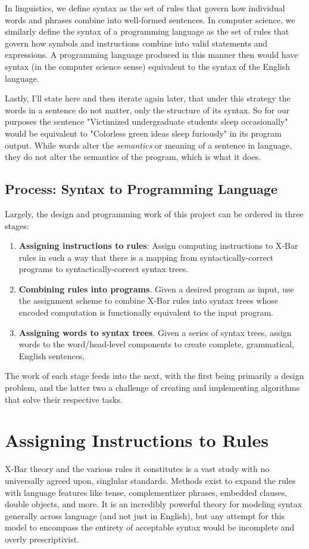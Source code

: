 \documentclass[runningheads]{llncs}
\begin{document}
In linguistics, we define syntax as the set of rules that govern how individual words and phrases combine into well-formed sentences. In computer science, we similarly define the syntax of a programming language as the set of rules that govern how symbols and instructions combine into valid statements and expressions. A programming language produced in this manner then would have syntax (in the computer science sense) equivalent to the syntax of the English language.

Lastly, I'll state here and then iterate again later, that under this strategy the words in a sentence do not matter, only the structure of its syntax. So for our purposes the sentence "Victimized undergraduate students sleep occasionally" would be equivalent to "Colorless green ideas sleep furiously" in its program output. While words alter the \textit{semantics} or meaning of a sentence in language, they do not alter the semantics of the program, which is what it does.

\subsection{Process: Syntax to Programming Language}
Largely, the design and programming work of this project can be ordered in three stages:
\begin{enumerate}
	\item \textbf{Assigning instructions to rules}: Assign computing instructions to X-Bar rules in such a way that there is a mapping from syntactically-correct programs to syntactically-correct syntax trees.
	\item \textbf{Combining rules into programs}. Given a desired program as input, use the assignment scheme to combine X-Bar rules into syntax trees whose encoded computation is functionally equivalent to the input program.
	\item \textbf{Assigning words to syntax trees}. Given a series of syntax trees, assign words to the word/head-level components to create complete, grammatical, English sentences.
\end{enumerate}
The work of each stage feeds into the next, with the first being primarily a design problem, and the latter two a challenge of creating and implementing algorithms that solve their respective tasks.

\section{Assigning Instructions to Rules}
X-Bar theory and the various rules it constitutes is a vast study with no universally agreed upon, singlular standards. Methods exist to expand the rules with language features like tense, complementizer phrases, embedded clauses, double objects, and more. \cite{hoekstra1991} \cite{carnie2006}
It is an incredibly powerful theory for modeling syntax generally across language (and not just in English), but any attempt for this model to encompass the entirety of acceptable syntax would be incomplete and overly prescriptivist.
\end{document}
